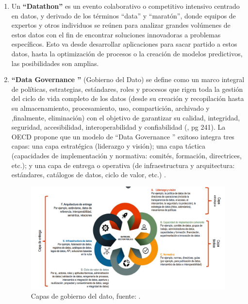 \begin{enumerate}
	\item Un \textbf{``Datathon''} \label{def7} \citep{Datathon2016Anslow} es un evento colaborativo o competitivo intensivo centrado en datos, y derivado de los términos ``data'' y ``maratón'', donde equipos de expertos y otros individuos se reúnen para analizar grandes volúmenes de estos datos con el fin de encontrar soluciones innovadoras a problemas específicos. Esto va desde desarrollar aplicaciones para sacar partido a estos datos, hasta la optimización de procesos o la creación de modelos predictivos, las posibilidades son amplias. \\
	
	\item \textbf{``Data Governance ''} \label{def10} (Gobierno del Dato) se define como un marco integral de políticas, estrategias, estándares, roles y procesos que rigen toda la gestión del ciclo de vida completo de los datos (desde su creación y recopilación hasta su almacenamiento, procesamiento, uso, compartición, archivado y ,finalmente, eliminación) con el objetivo de garantizar su calidad, integridad, seguridad, accesibilidad, interoperabilidad y confiabilidad (\cite{HerreraCapriz2024}, pg 241). La OECD propone que un modelo de ``Data Governance '' exitoso integra tres capas: una capa estratégica (liderazgo y visión); una capa táctica (capacidades de implementación y normativa: comités, formación, directrices, etc.); y una capa de entrega o operativa (de infraestructura y arquitectura: estándares, catálogos de datos, ciclo de valor, etc.) \citep{OECD2019}.
			
	\begin{figure}[!tbp]
		\begin{center}
			\includegraphics[scale=0.3]{Imagenes/Bitmap/data_gobernance.png} 
			\caption{Capas de gobierno del dato, fuente: \citep{OECD2019}.}
		\end{center}
	\end{figure}
	

\end{enumerate}
